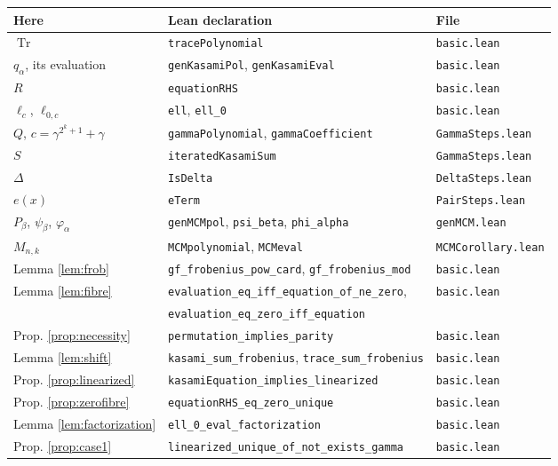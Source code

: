 \documentclass[11pt,a4paper]{article}
\theoremstyle{definition}
\newcommand{\Tr}{\operatorname{Tr}}
\newcommand{\rhs}{R}
\begin{document}
\begin{center}
\begin{tabular}{lll}
\hline
Here & Lean declaration & File\\
\hline
$\Tr$ & \texttt{tracePolynomial} & \texttt{basic.lean}\\
$q_\alpha$, its evaluation & \texttt{genKasamiPol}, \texttt{genKasamiEval} & \texttt{basic.lean}\\
$\rhs$ & \texttt{equationRHS} & \texttt{basic.lean}\\
$\ell_c$, $\ell_{0,c}$ & \texttt{ell}, \texttt{ell\_0} & \texttt{basic.lean}\\
$Q$, $c=\gamma^{2^{k}+1}+\gamma$ & \texttt{gammaPolynomial}, \texttt{gammaCoefficient} & \texttt{GammaSteps.lean}\\
$S$ & \texttt{iteratedKasamiSum} & \texttt{GammaSteps.lean}\\
$\Delta$ & \texttt{IsDelta} & \texttt{DeltaSteps.lean}\\
$e(x)$ & \texttt{eTerm} & \texttt{PairSteps.lean}\\
$P_\beta$, $\psi_\beta$, $\varphi_\alpha$ & \texttt{genMCMpol}, \texttt{psi\_beta}, \texttt{phi\_alpha} & \texttt{genMCM.lean}\\
$M_{n,k}$ & \texttt{MCMpolynomial}, \texttt{MCMeval} & \texttt{MCMCorollary.lean}\\
\hline
Lemma \ref{lem:frob} & \texttt{gf\_frobenius\_pow\_card}, \texttt{gf\_frobenius\_mod} & \texttt{basic.lean}\\
Lemma \ref{lem:fibre} & \texttt{evaluation\_eq\_iff\_equation\_of\_ne\_zero}, & \texttt{basic.lean}\\
 & \texttt{evaluation\_eq\_zero\_iff\_equation} & \\
Prop. \ref{prop:necessity} & \texttt{permutation\_implies\_parity} & \texttt{basic.lean}\\
Lemma \ref{lem:shift} & \texttt{kasami\_sum\_frobenius}, \texttt{trace\_sum\_frobenius} & \texttt{basic.lean}\\
Prop. \ref{prop:linearized} & \texttt{kasamiEquation\_implies\_linearized} & \texttt{basic.lean}\\
Prop. \ref{prop:zerofibre} & \texttt{equationRHS\_eq\_zero\_unique} & \texttt{basic.lean}\\
Lemma \ref{lem:factorization} & \texttt{ell\_0\_eval\_factorization} & \texttt{basic.lean}\\
Prop. \ref{prop:case1} & \texttt{linearized\_unique\_of\_not\_exists\_gamma} & \texttt{basic.lean}\\

\end{tabular}
\end{center}
\end{document}
